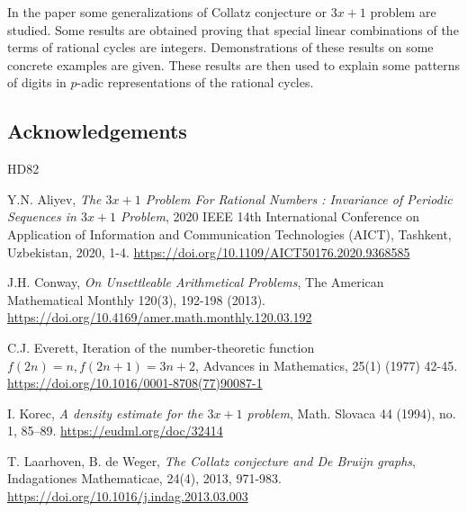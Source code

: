 \documentclass[12pt, twoside, leqno]{article}
\theoremstyle{definition}
\numberwithin{equation}{section}
\begin{document}
In the paper some generalizations of Collatz conjecture or $3x+1$ problem are studied. Some results are obtained proving that special linear combinations of the terms of rational cycles are integers. Demonstrations of these results on some concrete examples are given. These results are then used to explain some patterns of digits in $p$-adic representations of the rational cycles.
\subsection*{Acknowledgements}

\begin{thebibliography}{HD82}




\normalsize
\baselineskip=17pt
 
 Y.N. Aliyev, \textit{The $3x+1$ Problem For Rational Numbers : Invariance of Periodic Sequences in $3x+1$ Problem}, 2020 IEEE 14th International Conference on Application of Information and Communication Technologies (AICT), Tashkent, Uzbekistan, 2020, 1-4. \url{https://doi.org/10.1109/AICT50176.2020.9368585}

 J.H. Conway, \textit{On Unsettleable Arithmetical Problems}, The American Mathematical Monthly 120(3), 192-198 (2013). \url{https://doi.org/10.4169/amer.math.monthly.120.03.192}

 C.J. Everett,
Iteration of the number-theoretic function $f(2n) = n, f(2n + 1) = 3n + 2$,
Advances in Mathematics, 25(1) (1977) 42-45. \url{https://doi.org/10.1016/0001-8708(77)90087-1}

 I. Korec, \textit{A density estimate for the $3x+1$ problem}, Math. Slovaca 44 (1994), no. 1, 85–89. \url{https://eudml.org/doc/32414}

 T. Laarhoven, B. de Weger, \textit{The Collatz conjecture and De Bruijn graphs}, Indagationes Mathematicae, 24(4), 2013, 971-983. \url{https://doi.org/10.1016/j.indag.2013.03.003}


\end{thebibliography}
\end{document}
